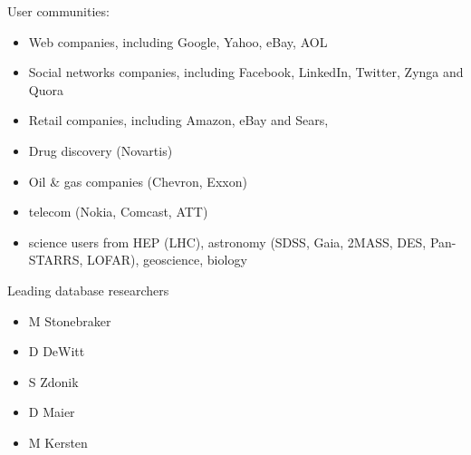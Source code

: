 \documentclass[DM,lsstdraft,toc]{lsstdoc}
\begin{document}
User communities:

\begin{itemize}
\item
  Web companies, including Google, Yahoo, eBay, AOL
\item
  Social networks companies, including Facebook, LinkedIn, Twitter,
  Zynga and Quora
\item
  Retail companies, including Amazon, eBay and Sears,
\item
  Drug discovery (Novartis)
\item
  Oil \& gas companies (Chevron, Exxon)
\item
  telecom (Nokia, Comcast, ATT)
\item
  science users from HEP (LHC), astronomy (SDSS, Gaia, 2MASS, DES,
  Pan-STARRS, LOFAR), geoscience, biology
\end{itemize}

Leading database researchers

\begin{itemize}
\item
  M Stonebraker
\item
  D DeWitt
\item
  S Zdonik
\item
  D Maier
\item
  M Kersten
\end{itemize}
\end{document}
